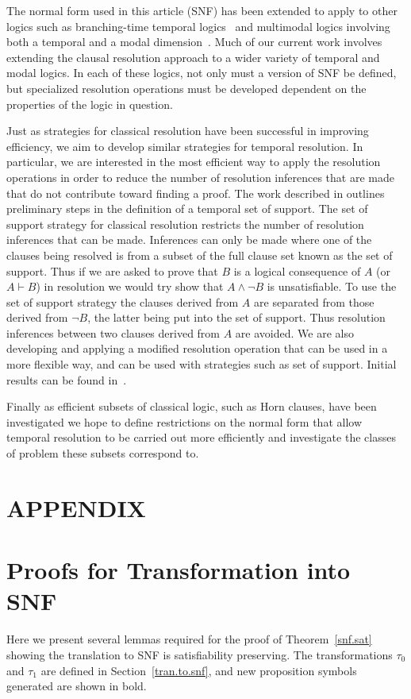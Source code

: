 \documentclass[nohyperref]{acmtrans2f}
\begin{document}
The normal form used in this article (SNF) has been extended to apply to
other logics such as branching-time temporal logics~\cite{BF97:ctl}
and multimodal logics involving both a temporal and a modal
dimension~\cite{DFW98:JLC}. Much of our current work involves
extending the clausal resolution approach to a wider variety of
temporal and modal logics. In each of these logics, not only must a
version of SNF be defined, but specialized resolution operations must
be developed dependent on the properties of the logic in question.

Just as strategies for classical resolution have been successful in
improving efficiency, we aim to develop similar strategies for
temporal resolution. In particular, we are interested in the most
efficient way to apply the resolution operations in order to reduce
the number of resolution inferences that are made that do not
contribute toward finding a proof. The work described in 
outlines preliminary steps in the definition of a temporal set of
support. The set of support strategy for classical resolution restricts the
number of resolution inferences that can be made. Inferences can only be
made where one of the clauses being resolved is from a subset of the full
clause set known as the set of support. Thus if we are asked to prove that
$B$ is a logical consequence of $A$ (or $A \vdash B$) in resolution we
would try show that $A \land \neg B$ is unsatisfiable. To use the set of
support strategy the clauses derived
from $A$ are separated from those derived from $\neg B$, the latter being
put into the set of support. Thus resolution inferences between two clauses
derived from $A$ are avoided. We are also developing and
applying a modified resolution operation that can be used in a more
flexible way, and  can be used with strategies such as set of
support. Initial results can be found in~.

Finally as efficient subsets of classical logic, such as Horn clauses,
have been investigated we hope to define restrictions on the normal
form that allow temporal resolution to be carried out more efficiently
and investigate the classes of problem these subsets correspond to.

%
\appendix
\section*{APPENDIX}
 \section{Proofs for Transformation into SNF}
\label{snf.proofs}
Here we present several lemmas required for the proof of Theorem~\ref{snf.sat}
showing the translation to SNF is satisfiability preserving. The transformations
$\tau_0$ and $\tau_1$ are defined in Section~\ref{tran.to.snf}, and new
proposition symbols generated are shown in bold.
\end{document}
